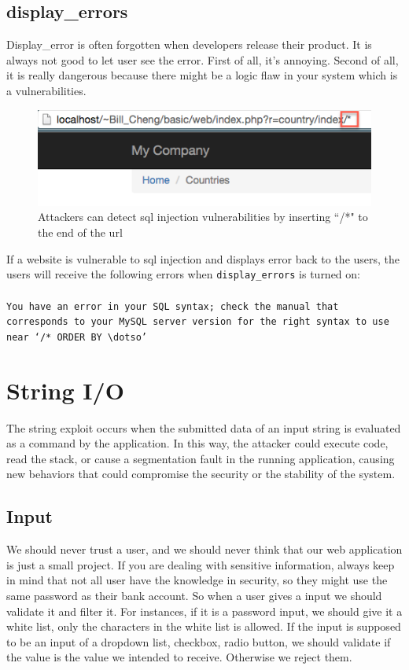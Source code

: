 \documentclass[conference]{IEEEtran}
\begin{document}
\subsection{display\_errors}
Display\_error is often forgotten when developers release their product. It is always not good to let user see the error. First of all, it's annoying. Second of all, it is really dangerous because there might be a logic flaw in your system which is a vulnerabilities. 
\begin{figure}[h]
\includegraphics[scale=0.45]{displayerror}
\centering
\caption{Attackers can detect sql injection vulnerabilities by inserting ``/*" to the end of the url}
\end{figure}

If a website is vulnerable to sql injection and displays error back to the users, the users will receive the following errors when \texttt{display\_errors} is turned on: \\\\
\texttt{You have an error in your SQL syntax; check the manual that corresponds to your MySQL server version for the right syntax to use near `/* ORDER BY $\dotso$'}

\section{String I/O}
The string exploit occurs when the submitted data of an input string is evaluated as a command by the application. In this way, the attacker could execute code, read the stack, or cause a segmentation fault in the running application, causing new behaviors that could compromise the security or the stability of the system.

\subsection{Input}
We should never trust a user, and we should never think that our web application is just a small project. If you are dealing with sensitive information, always keep in mind that not all user have the knowledge in security, so they might use the same password as their bank account. So when a user gives a input we should validate it and filter it. For instances, if it is a password input, we should give it a white list, only the characters in the white list is allowed. If the input is supposed to be an input of a dropdown list, checkbox, radio button, we should validate if the value is the value we intended to receive. Otherwise we reject them.
\end{document}
